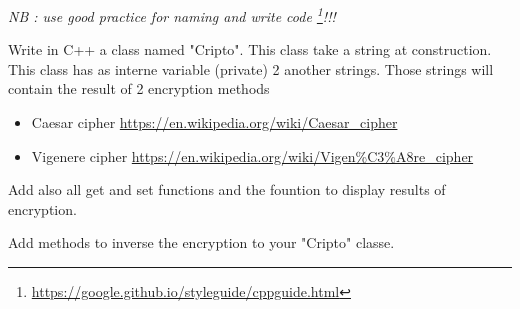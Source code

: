 \documentclass[12pt]{tdtp}
\begin{document}
\titre
\textit{NB : use good practice for naming and write code \footnote{\url{https://google.github.io/styleguide/cppguide.html}}!!!}

\Exo

Write in C++ a class named "Cripto". This class take a string at construction. This class has as interne variable (private) 2 another strings.
Those strings will contain the result of 2 encryption methods

\begin{itemize}
	\item Caesar cipher \url{https://en.wikipedia.org/wiki/Caesar_cipher}
	\item Vigenere cipher \url{https://en.wikipedia.org/wiki/Vigen%C3%A8re_cipher}
\end{itemize}

Add also all get and set functions and the fountion to display results of encryption.

\Exo

Add methods to inverse the encryption to your "Cripto" classe.
\end{document}
